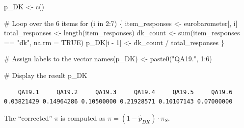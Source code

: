 \documentclass[
  letterpaper,
  DIV=11,
  numbers=noendperiod]{scrartcl}
\newenvironment{Shaded}{\begin{snugshade}}{\end{snugshade}}
\newcommand{\AttributeTok}[1]{\textcolor[rgb]{0.40,0.45,0.13}{#1}}
\newcommand{\CommentTok}[1]{\textcolor[rgb]{0.37,0.37,0.37}{#1}}
\newcommand{\ConstantTok}[1]{\textcolor[rgb]{0.56,0.35,0.01}{#1}}
\newcommand{\ControlFlowTok}[1]{\textcolor[rgb]{0.00,0.23,0.31}{#1}}
\newcommand{\DecValTok}[1]{\textcolor[rgb]{0.68,0.00,0.00}{#1}}
\newcommand{\FunctionTok}[1]{\textcolor[rgb]{0.28,0.35,0.67}{#1}}
\newcommand{\NormalTok}[1]{\textcolor[rgb]{0.00,0.23,0.31}{#1}}
\newcommand{\OtherTok}[1]{\textcolor[rgb]{0.00,0.23,0.31}{#1}}
\newcommand{\SpecialCharTok}[1]{\textcolor[rgb]{0.37,0.37,0.37}{#1}}
\newcommand{\StringTok}[1]{\textcolor[rgb]{0.13,0.47,0.30}{#1}}
\begin{document}
\begin{Shaded}
\begin{Highlighting}[]
\NormalTok{p\_DK }\OtherTok{\textless{}{-}} \FunctionTok{c}\NormalTok{()}

\CommentTok{\# Loop over the 6 items}
\ControlFlowTok{for}\NormalTok{ (i }\ControlFlowTok{in} \DecValTok{2}\SpecialCharTok{:}\DecValTok{7}\NormalTok{) \{}
\NormalTok{  item\_responses }\OtherTok{\textless{}{-}}\NormalTok{ eurobarometer[, i]}
\NormalTok{  total\_responses }\OtherTok{\textless{}{-}} \FunctionTok{length}\NormalTok{(item\_responses)}
\NormalTok{  dk\_count }\OtherTok{\textless{}{-}} \FunctionTok{sum}\NormalTok{(item\_responses }\SpecialCharTok{==} \StringTok{"dk"}\NormalTok{, }\AttributeTok{na.rm =} \ConstantTok{TRUE}\NormalTok{)}
\NormalTok{  p\_DK[i }\SpecialCharTok{{-}} \DecValTok{1}\NormalTok{] }\OtherTok{\textless{}{-}}\NormalTok{ dk\_count }\SpecialCharTok{/}\NormalTok{ total\_responses}
\NormalTok{\}}

\CommentTok{\# Assign labels to the vector}
\FunctionTok{names}\NormalTok{(p\_DK) }\OtherTok{\textless{}{-}} \FunctionTok{paste0}\NormalTok{(}\StringTok{"QA19."}\NormalTok{, }\DecValTok{1}\SpecialCharTok{:}\DecValTok{6}\NormalTok{)}

\CommentTok{\# Display the result}
\NormalTok{p\_DK}
\end{Highlighting}
\end{Shaded}

\begin{verbatim}
    QA19.1     QA19.2     QA19.3     QA19.4     QA19.5     QA19.6 
0.03821429 0.14964286 0.10500000 0.21928571 0.10107143 0.07000000 
\end{verbatim}

\begin{Shaded}
\end{Shaded}

The ``corrected'' \(\pi\) is computed as
\(\pi = (1-\hat{p}_{DK})\cdot\pi_S\).

\begin{Shaded}
\end{Shaded}
\end{document}
